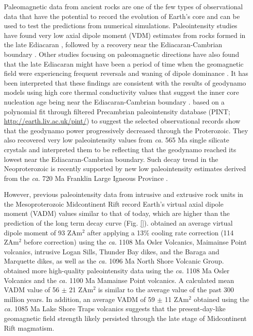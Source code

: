 \documentclass[draft]{agujournal2019}
\begin{document}
Paleomagnetic data from ancient rocks are one of the few types of observational data that have the potential to record the evolution of Earth’s core and can be used to test the predictions from numerical simulations. Paleointensity studies have found very low axial dipole moment (VDM) estimates from rocks formed in the late Ediacaran \cite{Bono2019a, Shcherbakova2019a, Thallner2021b}, followed by a recovery near the Ediacaran-Cambrian boundary \cite{Thallner2021a}. Other studies focusing on paleomagnetic directions have also found that the late Ediacaran might have been a period of time when the geomagnetic field were experiencing frequent reversals and waning of dipole dominance \cite{Bono2015a, Kodama2020a}. It has been interpreted that these findings are consistent with the results of geodynamo models using high core thermal conductivity values that suggest the inner core nucleation age being near the Ediacaran-Cambrian boundary \cite{Driscoll2016a, Davies2021a}.  based on a polynomial fit through filtered Precambrian paleointensity database (PINT; \url{http://earth.liv.ac.uk/pint/}) to suggest the selected observational records show that the geodynamo power progressively decreased through the Proterozoic. They also recovered very low paleointensity values from \textit{ca.} 565 Ma single silicate crystals and interpreted them to be reflecting that the geodynamo reached its lowest near the Ediacaran-Cambrian boundary. Such decay trend in the Neoproterozoic is recently supported by new low paleointensity estimates derived from the \textit{ca.} 720 Ma Franklin Large Igneous Province \cite{Lloyd2021a}. 

However, previous paleointensity data from intrusive and extrusive rock units in the Mesoproterozoic Midcontinent Rift \cite{Pesonen1983a, Kulakov2013a, Sprain2018a} record Earth's virtual axial dipole moment (VADM) values similar to that of today, which are higher than the prediction of the long term decay curve (Fig. \ref{}).  obtained an average virtual dipole moment of 93 ZAm$^2$ after applying a 13\% cooling rate correction (114 ZAm$^2$ before correction) using the \textit{ca.} 1108 Ma Osler Volcanics, Maimainse Point volcanics, intrusive Logan Sills, Thunder Bay dikes, and the Baraga and Marquette dikes, as well as the \textit{ca.} 1096 Ma North Shore Volcanic Group.  obtained more high-quality paleointensity data using the \textit{ca.} 1108 Ma Osler Volcanics and the \textit{ca.} 1100 Ma Mamainse Point volcanics. A calculated mean VADM value of 56 $\pm$ 21 ZAm$^2$ is similar to the average value of the past 300 million years. In addition, an average VADM of 59 $\pm$ 11 ZAm$^2$ obtained  using the \textit{ca.} 1085 Ma Lake Shore Traps volcanics suggests that the present-day-like geomagnetic field strength likely persisted through the late stage of Midcontinent Rift magmatism. 
\end{document}
